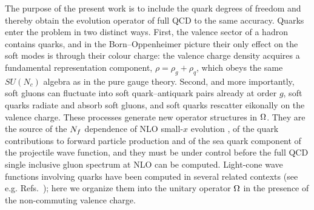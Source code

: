The purpose of the present work is to include the quark degrees of freedom and thereby obtain
the evolution operator of full QCD to the same accuracy. Quarks enter the problem in two
distinct ways. First, the valence sector of a hadron contains quarks, and in the
Born--Oppenheimer picture \cite{Duan:2024nlr,Duan:2024qev,Duan:2024BOmodBFKL} their only effect on the
soft modes is through their colour charge: the valence charge density acquires a fundamental
representation component, $\rho=\rho_{g}+\rho_{q}$, which obeys the same $SU(N_{c})$ algebra as
in the pure gauge theory. Second, and more importantly, soft gluons can fluctuate into soft
quark--antiquark pairs already at order $g$, soft quarks radiate and absorb soft gluons, and
soft quarks rescatter eikonally on the valence charge. These processes generate new operator
structures in $\Omega$. They are the source of the $N_{f}$ dependence of NLO small-$x$ evolution
\cite{Balitsky:2006wa,Kovchegov:2006vj,Balitsky:2007feb,Kovner:2013ona,Lublinsky:2016meo}, of the
quark contributions to forward particle production and of the sea quark component of the
projectile wave function, and they must be under control before the full QCD single inclusive
gluon spectrum at NLO \cite{LRS:inprep} can be computed. Light-cone wave functions involving
quarks have been computed in several related contexts (see e.g.
Refs.~\cite{Beuf:2016wdz,Hanninen:2017ddy,Lappi:2016oup,Lappi:2026dglap}); here we organize them into
the unitary operator $\Omega$ in the presence of the non-commuting valence charge.

